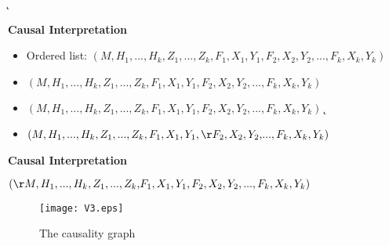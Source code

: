 \documentclass[landscape,dvips,a4]{seminar}
\begin{document}
\begin{slide}\addtocounter{slide}{-1}
\k
  \begin{center}
    \textbf{\Large Causal Interpretation}
  \end{center}
 \vspace{3mm}
\begin{itemize}
\g
\item Ordered list:  $(M,H_1,...,H_k,Z_1,...,Z_k,F_1,X_1,Y_1,F_2,X_2,Y_2,...,F_k,X_k,Y_k)$

\item
  $(M,H_1,...,H_k,Z_1,...,Z_k,F_1,X_1,Y_1,F_2,X_2,Y_2,...,F_k,X_k,Y_k)$
\item
  $(M,H_1,...,H_k,Z_1,...,Z_k,F_1,X_1,Y_1,F_2,X_2,Y_2,...,F_k,X_k,Y_k)$
\k
\item $(M,H_1,...,H_k,Z_1,...,Z_k,F_1,X_1,Y_1,{\r F_2,X_2,Y_2,}...,F_k,X_k,Y_k)$
\end{itemize}
\end{slide}



\begin{slide}
  \begin{center}
    \textbf{\Large Causal Interpretation}
  \end{center}
 \vspace{3mm}
$({\r M,H_1,...,H_k,Z_1,...,Z_k,}F_1,X_1,Y_1,F_2,X_2,Y_2,...,F_k,X_k,Y_k)$
\begin{figure*}[t]
  \centering





  \texttt{[image: V3.eps]}
  \caption{The causality graph}
  \label{fig:fig2}
\end{figure*}
\end{slide}
\end{document}
